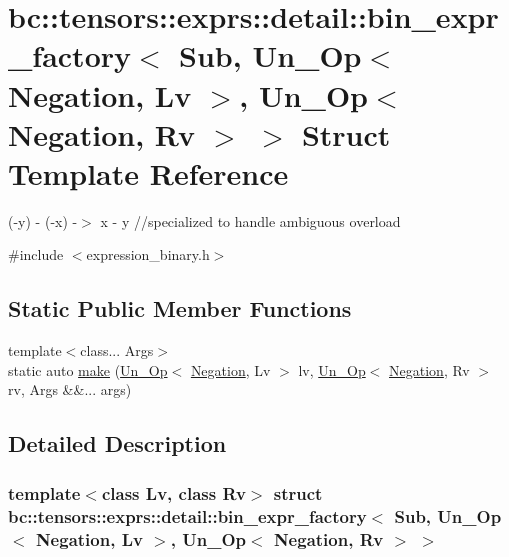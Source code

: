 \hypertarget{structbc_1_1tensors_1_1exprs_1_1detail_1_1bin__expr__factory_3_01Sub_00_01Un__Op_3_01Negation_004b0c12d341e754dc0e6fb842519b678e}{}\section{bc\+:\+:tensors\+:\+:exprs\+:\+:detail\+:\+:bin\+\_\+expr\+\_\+factory$<$ Sub, Un\+\_\+\+Op$<$ Negation, Lv $>$, Un\+\_\+\+Op$<$ Negation, Rv $>$ $>$ Struct Template Reference}
\label{structbc_1_1tensors_1_1exprs_1_1detail_1_1bin__expr__factory_3_01Sub_00_01Un__Op_3_01Negation_004b0c12d341e754dc0e6fb842519b678e}


(-\/y) -\/ (-\/x) -\/$>$ x -\/ y //specialized to handle ambiguous overload  




{\ttfamily \#include $<$expression\+\_\+binary.\+h$>$}

\subsection*{Static Public Member Functions}
\begin{DoxyCompactItemize}
\item 
{\footnotesize template$<$class... Args$>$ }\\static auto \hyperlink{structbc_1_1tensors_1_1exprs_1_1detail_1_1bin__expr__factory_3_01Sub_00_01Un__Op_3_01Negation_004b0c12d341e754dc0e6fb842519b678e_a8a07d7a099fa54d9326ec02b21f30d4e}{make} (\hyperlink{structbc_1_1tensors_1_1exprs_1_1Un__Op}{Un\+\_\+\+Op}$<$ \hyperlink{structbc_1_1oper_1_1Negation}{Negation}, Lv $>$ lv, \hyperlink{structbc_1_1tensors_1_1exprs_1_1Un__Op}{Un\+\_\+\+Op}$<$ \hyperlink{structbc_1_1oper_1_1Negation}{Negation}, Rv $>$ rv, Args \&\&... args)
\end{DoxyCompactItemize}


\subsection{Detailed Description}
\subsubsection*{template$<$class Lv, class Rv$>$\newline
struct bc\+::tensors\+::exprs\+::detail\+::bin\+\_\+expr\+\_\+factory$<$ Sub, Un\+\_\+\+Op$<$ Negation, Lv $>$, Un\+\_\+\+Op$<$ Negation, Rv $>$ $>$}

